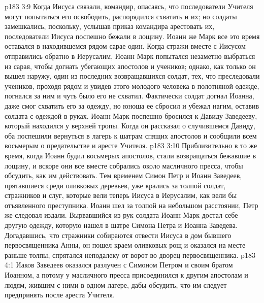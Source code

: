 \vs p183 3:9 Когда Иисуса связали, командир, опасаясь, что последователи Учителя могут попытаться его освободить, распорядился схватить и их; но солдаты замешкались, поскольку, услышав приказ командира арестовать их, последователи Иисуса поспешно бежали в лощину. Иоанн же Марк все это время оставался в находившемся рядом сарае один. Когда стражи вместе с Иисусом отправились обратно в Иерусалим, Иоанн Марк попытался незаметно выбраться из сарая, чтобы догнать убегающих апостолов и учеников; однако, как только он вышел наружу, один из последних возвращавшихся солдат, тех, что преследовали учеников, проходя рядом и увидев этого молодого человека в полотняной одежде, погнался за ним и чуть было его не схватил. Фактически солдат догнал Иоанна, даже смог схватить его за одежду, но юноша ее сбросил и убежал нагим, оставив солдата с одеждой в руках. Иоанн Марк поспешно бросился к Давиду Заведееву, который находился у верхней тропы. Когда он рассказал о случившемся Давиду, оба поспешили вернуться в лагерь к шатрам спящих апостолов и сообщили всем восьмерым о предательстве и аресте Учителя.
\vs p183 3:10 Приблизительно в то же время, когда Иоанн будил восьмерых апостолов, стали возвращаться бежавшие в лощину, и вскоре они все вместе собрались около масличного пресса, чтобы обсудить, как им действовать. Тем временем Симон Петр и Иоанн Заведеев, прятавшиеся среди оливковых деревьев, уже крались за толпой солдат, стражников и слуг, которые вели теперь Иисуса в Иерусалим, как вели бы отъявленного преступника. Иоанн шел за толпой на небольшом расстоянии, Петр же следовал издали. Вырвавшийся из рук солдата Иоанн Марк достал себе другую одежду, которую нашел в шатре Симона Петра и Иоанна Заведева. Догадавшись, что стражники собираются отвести Иисуса в дом бывшего первосвященника Анны, он пошел краем оливковых рощ и оказался на месте раньше толпы, спрятался неподалеку от ворот во дворец первосвященника.
\vs p183 4:1 Иаков Заведеев оказался разлучен с Симоном Петром и своим братом Иоанном, а потому у масличного пресса присоединился к другим апостолам и людям, жившим с ними в одном лагере, дабы обсудить, что им следует предпринять после ареста Учителя.
